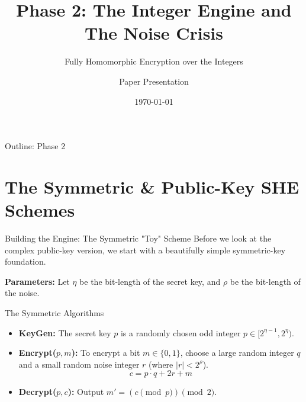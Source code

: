 \documentclass[10pt, aspectratio=169]{beamer}
\title[Phase 2: The Integer Engine]{Phase 2: The Integer Engine and The Noise Crisis}
\subtitle{Fully Homomorphic Encryption over the Integers}
\author{Paper Presentation}
\date{\today}
\begin{document}
\frame{\titlepage}

\begin{frame}{Outline: Phase 2}
    \tableofcontents
\end{frame}

\section{The Symmetric \& Public-Key SHE Schemes}

\begin{frame}{Building the Engine: The Symmetric "Toy" Scheme}
    Before we look at the complex public-key version, we start with a beautifully simple symmetric-key foundation.
    \pause
    
    \vspace{0.3cm}
    \textbf{Parameters:} Let $\eta$ be the bit-length of the secret key, and $\rho$ be the bit-length of the noise.
    \pause
    
    \begin{block}{The Symmetric Algorithms}
    \begin{itemize}
        \item \textbf{KeyGen:} The secret key $p$ is a randomly chosen odd integer $p \in [2^{\eta-1}, 2^{\eta})$.
        \item \textbf{Encrypt($p, m$):} To encrypt a bit $m \in \{0,1\}$, choose a large random integer $q$ and a small random noise integer $r$ (where $|r| < 2^{\rho}$). 
        $$c = p \cdot q + 2r + m$$
        \item \textbf{Decrypt($p, c$):} Output $m' = (c \pmod p) \pmod 2$.
    \end{itemize}
    \end{block}
\end{frame}
\end{document}
